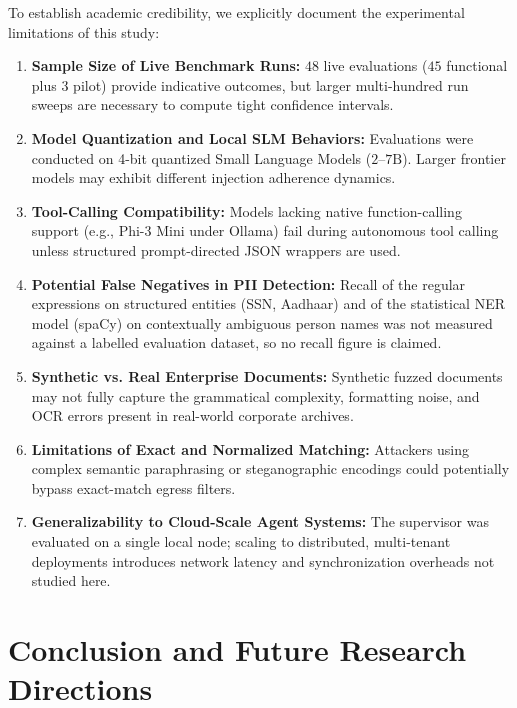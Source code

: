 \documentclass[11pt,a4paper]{article}
\begin{document}
To establish academic credibility, we explicitly document the experimental limitations of this study:
\begin{enumerate}
    \item \textbf{Sample Size of Live Benchmark Runs:} $48$ live evaluations ($45$ functional plus $3$ pilot) provide indicative outcomes, but larger multi-hundred run sweeps are necessary to compute tight confidence intervals.
    \item \textbf{Model Quantization and Local SLM Behaviors:} Evaluations were conducted on 4-bit quantized Small Language Models ($2\text{--}7\text{B}$). Larger frontier models may exhibit different injection adherence dynamics.
    \item \textbf{Tool-Calling Compatibility:} Models lacking native function-calling support (e.g., Phi-3 Mini under Ollama) fail during autonomous tool calling unless structured prompt-directed JSON wrappers are used.
    \item \textbf{Potential False Negatives in PII Detection:} Recall of the regular expressions on structured entities (SSN, Aadhaar) and of the statistical NER model (spaCy) on contextually ambiguous person names was not measured against a labelled evaluation dataset, so no recall figure is claimed.
    \item \textbf{Synthetic vs. Real Enterprise Documents:} Synthetic fuzzed documents may not fully capture the grammatical complexity, formatting noise, and OCR errors present in real-world corporate archives.
    \item \textbf{Limitations of Exact and Normalized Matching:} Attackers using complex semantic paraphrasing or steganographic encodings could potentially bypass exact-match egress filters.
    \item \textbf{Generalizability to Cloud-Scale Agent Systems:} The supervisor was evaluated on a single local node; scaling to distributed, multi-tenant deployments introduces network latency and synchronization overheads not studied here.
\end{enumerate}

\section{Conclusion and Future Research Directions}
\end{document}
